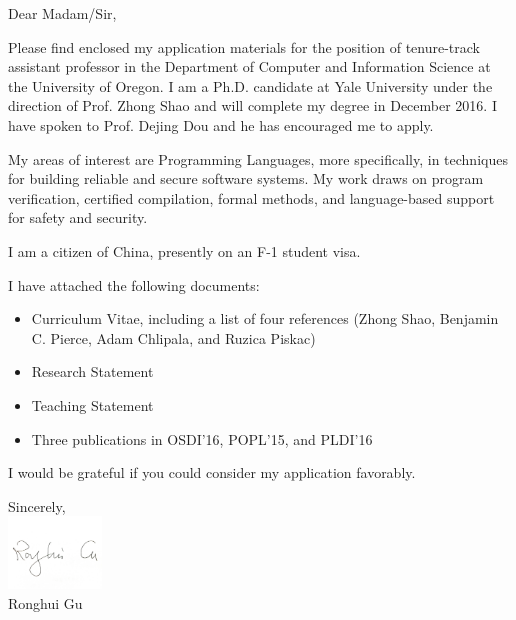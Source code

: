 \documentclass{letter}
\date{December 1, 2016}
\makeatletter
\newcommand{\subject}[1]{\def\@subject{{\centering{#1}}}}
\makeatother
\begin{document}
\begin{letter}{}

\subject{\begin{center} Re: Application for the position of tenure-track assistant professor\end{center}}


\opening{Dear Madam/Sir,}
Please find enclosed my application materials for the position of
tenure-track assistant professor in the Department of Computer and Information Science at the University of Oregon. 
I am a Ph.D. candidate at Yale University under
the direction of Prof. Zhong Shao and will complete my degree in December 2016. I
have spoken to Prof. Dejing Dou and he has encouraged me to
apply. 


My areas of interest are Programming Languages,
more specifically, in techniques for building reliable and secure software systems. My work draws on program verification,
certified compilation, formal methods, and language-based support for safety and security.

I am a citizen of China, presently on an F-1 student visa.

I have attached the following documents:
\begin{itemize}
\item  Curriculum Vitae, including a list of four references (Zhong Shao, Benjamin C. Pierce, Adam Chlipala, and Ruzica Piskac)
\item Research Statement
\item Teaching Statement 
\item Three publications in OSDI'16, POPL'15, and PLDI'16
\end{itemize}

I would be grateful if you could consider my application favorably.




\closing{Sincerely,\\
\vspace{3pt}
\includegraphics[width=2.5cm]{signature.pdf}\\
Ronghui Gu
}

\end{letter}
\end{document}
